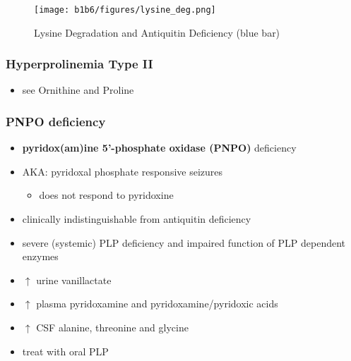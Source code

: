 \documentclass[12pt]{scrartcl}
\begin{document}
\begin{figure}[htbp]
\centering
\texttt{[image: b1b6/figures/lysine\_deg.png]}
\caption{\label{fig:orga634b0b}Lysine Degradation and Antiquitin Deficiency (blue bar)}
\end{figure}

\subsubsection{Hyperprolinemia Type II}
\label{sec:orgbbd237a}
\begin{itemize}
\item see Ornithine and Proline
\end{itemize}

\subsubsection{PNPO deficiency}
\label{sec:org3d243cd}
\begin{itemize}
\item \textbf{pyridox(am)ine 5’-phosphate oxidase (PNPO)} deficiency
\item AKA: pyridoxal phosphate responsive seizures
\begin{itemize}
\item does not respond to pyridoxine
\end{itemize}
\item clinically indistinguishable from antiquitin deficiency
\item severe (systemic) PLP deficiency and impaired function of PLP
dependent enzymes
\item \(\uparrow\) urine vanillactate
\item \(\uparrow\) plasma pyridoxamine and pyridoxamine/pyridoxic acids
\item \(\uparrow\) CSF alanine, threonine and glycine
\item treat with oral PLP
\end{itemize}
\end{document}
